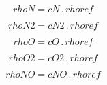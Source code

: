 \documentclass{article}
\begin{document}
\begin{dmath}rhoN = cN \,.\, rhoref\end{dmath}

\begin{dmath}rhoN2 = cN2 \,.\, rhoref\end{dmath}

\begin{dmath}rhoO = cO \,.\, rhoref\end{dmath}

\begin{dmath}rhoO2 = cO2 \,.\, rhoref\end{dmath}

\begin{dmath}rhoNO = cNO \,.\, rhoref\end{dmath}
\end{document}
